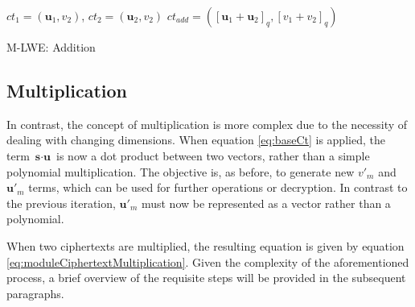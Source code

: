 \begin{algorithm}[htb]
  \begin{algorithmic}[1]
    \REQUIRE $ct_1 = (\textbf{u}_1, v_2)$, $ct_2 = (\textbf{u}_2, v_2)$
    \RETURN $ct_{add} = ([\textbf{u}_1 + \textbf{u}_2]_q, [v_1 + v_2]_q)$
  \end{algorithmic}
  \caption{M-LWE: Addition}
  \label{alg:MlweAddition}
\end{algorithm}

\subsection*{Multiplication}

In contrast, the concept of multiplication is more complex due to the necessity of dealing with changing dimensions. When equation \ref{eq:baseCt} is applied, the term $\textbf{s}\cdot \textbf{u}$ is now a dot product between two vectors, rather than a simple polynomial multiplication. The objective is, as before, to generate new $v'_m$ and $\textbf{u}'_m$ terms, which can be used for further operations or decryption. In contrast to the previous iteration, $\textbf{u}'_m$ must now be represented as a vector rather than a polynomial.

When two ciphertexts are multiplied, the resulting equation is given by equation \ref{eq:moduleCiphertextMultiplication}. Given the complexity of the aforementioned process, a brief overview of the requisite steps will be provided in the subsequent paragraphs.

